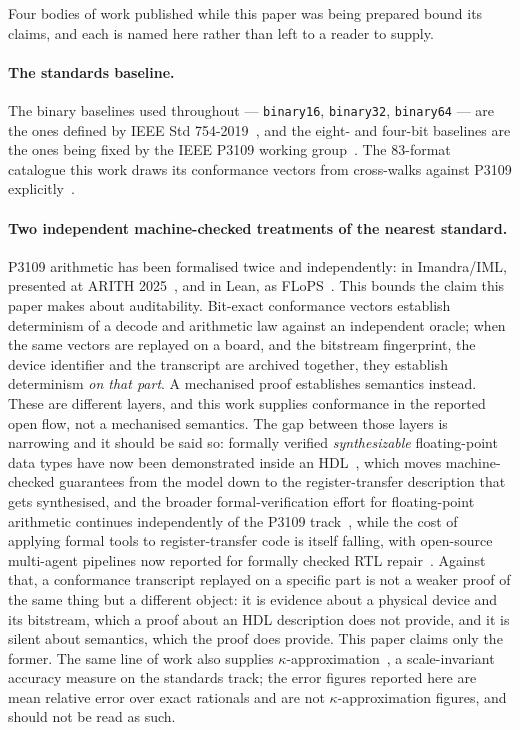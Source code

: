 \documentclass[11pt]{article}
\theoremstyle{definition}
\begin{document}
Four bodies of work published while this paper was being prepared bound its
claims, and each is named here rather than left to a reader to supply.

\paragraph{The standards baseline.} The binary baselines used throughout ---
\texttt{binary16}, \texttt{binary32}, \texttt{binary64} --- are the ones defined
by IEEE Std 754-2019~\cite{ieee754_2019}, and the eight- and four-bit baselines
are the ones being fixed by the IEEE P3109 working
group~\cite{p3109wg2026}. The 83-format catalogue this work draws its
conformance vectors from cross-walks against P3109 explicitly~\cite{catalogue}.

\paragraph{Two independent machine-checked treatments of the nearest standard.}
P3109 arithmetic has been formalised twice and independently: in Imandra/IML,
presented at ARITH 2025~\cite{wintersteiger2025}, and in Lean, as
FLoPS~\cite{flops2026}. This bounds the claim this paper makes about
auditability. Bit-exact conformance vectors establish determinism of a decode
and arithmetic law against an independent oracle; when the same vectors are
replayed on a board, and the bitstream fingerprint, the device identifier and the
transcript are archived together, they establish determinism \emph{on that part}.
A mechanised proof establishes semantics instead. These are different layers, and
this work supplies conformance in the reported open flow, not a mechanised
semantics. The gap between those layers is narrowing and it should be said so:
formally verified \emph{synthesizable} floating-point data types have now been
demonstrated inside an HDL~\cite{archhdl2026}, which moves machine-checked
guarantees from the model down to the register-transfer description that gets
synthesised, and the broader formal-verification effort for floating-point
arithmetic continues independently of the P3109 track~\cite{mohanty2025}, while
the cost of applying formal tools to register-transfer code is itself falling, with
open-source multi-agent pipelines now reported for formally checked RTL
repair~\cite{tran2026rtlrepair}. Against
that, a conformance transcript replayed on a specific part is not a weaker proof
of the same thing but a different object: it is evidence about a physical device
and its bitstream, which a proof about an HDL description does not provide, and it
is silent about semantics, which the proof does provide. This paper claims only
the former. The same line of
work also supplies $\kappa$-approximation~\cite{fitzgibbon2026kappa}, a
scale-invariant accuracy measure on the standards track; the error figures
reported here are mean relative error over exact rationals and are not
$\kappa$-approximation figures, and should not be read as such.
\end{document}
